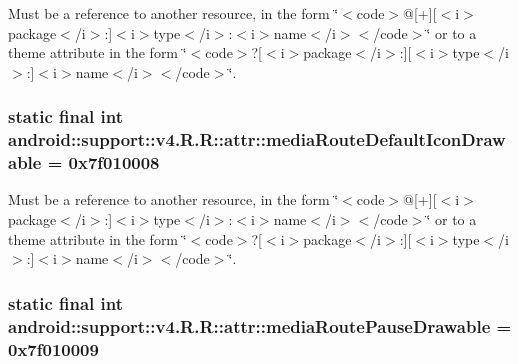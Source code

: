 Must be a reference to another resource, in the form \char`\"{}$<$code$>$@\mbox{[}+\mbox{]}\mbox{[}$<$i$>$package$<$/i$>$:\mbox{]}$<$i$>$type$<$/i$>$:$<$i$>$name$<$/i$>$$<$/code$>$\char`\"{} or to a theme attribute in the form \char`\"{}$<$code$>$?\mbox{[}$<$i$>$package$<$/i$>$:\mbox{]}\mbox{[}$<$i$>$type$<$/i$>$:\mbox{]}$<$i$>$name$<$/i$>$$<$/code$>$\char`\"{}. \hypertarget{classandroid_1_1support_1_1v4_1_1_r_1_1attr_2debbad1a2aac772f35f60dbc40dcc57}{
\subsubsection[{mediaRouteDefaultIconDrawable}]{\setlength{\rightskip}{0pt plus 5cm}static final int android::support::v4.R.R::attr::mediaRouteDefaultIconDrawable = 0x7f010008}}
\label{classandroid_1_1support_1_1v4_1_1_r_1_1attr_2debbad1a2aac772f35f60dbc40dcc57}


Must be a reference to another resource, in the form \char`\"{}$<$code$>$@\mbox{[}+\mbox{]}\mbox{[}$<$i$>$package$<$/i$>$:\mbox{]}$<$i$>$type$<$/i$>$:$<$i$>$name$<$/i$>$$<$/code$>$\char`\"{} or to a theme attribute in the form \char`\"{}$<$code$>$?\mbox{[}$<$i$>$package$<$/i$>$:\mbox{]}\mbox{[}$<$i$>$type$<$/i$>$:\mbox{]}$<$i$>$name$<$/i$>$$<$/code$>$\char`\"{}. \hypertarget{classandroid_1_1support_1_1v4_1_1_r_1_1attr_ac7bfc56fec3f7e25bfde9b2c141a667}{
\subsubsection[{mediaRoutePauseDrawable}]{\setlength{\rightskip}{0pt plus 5cm}static final int android::support::v4.R.R::attr::mediaRoutePauseDrawable = 0x7f010009}}
\label{classandroid_1_1support_1_1v4_1_1_r_1_1attr_ac7bfc56fec3f7e25bfde9b2c141a667}


